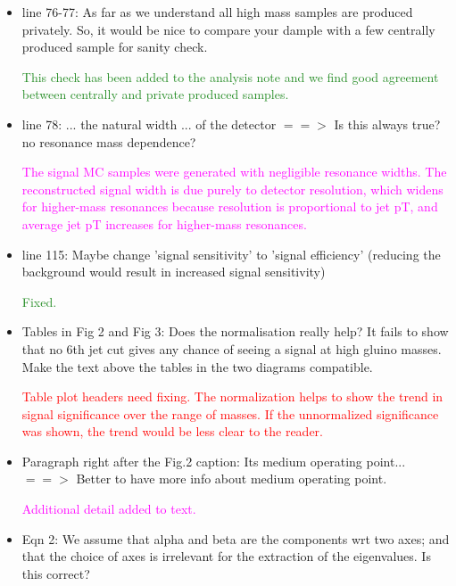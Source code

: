 \documentclass[paper=a4, fontsize=11pt]{scrartcl}
\begin{document}
\begin{itemize}
\item line 76-77: As far as we understand all high mass samples are produced privately. So, it would be nice to compare your dample with a few centrally produced sample for sanity check.

\textcolor{ForestGreen}{This check has been added to the analysis note and we find good agreement between 
centrally and private produced samples.}

\item line 78: ... the natural width ... of the detector $==>$ Is this always true? no resonance mass dependence?

\textcolor{magenta}{The signal MC samples were generated with negligible
resonance widths. The reconstructed signal width is due purely to 
detector resolution, which widens for higher-mass resonances
because resolution is proportional to jet pT, and average jet pT increases for
higher-mass resonances.}\\


\item line 115: Maybe change 'signal sensitivity' to 'signal efficiency' (reducing the background would result in increased signal sensitivity)

\textcolor{ForestGreen}{Fixed.}\\

\item Tables in Fig 2 and Fig 3: Does the normalisation really help? It fails to show that no 6th jet cut gives any chance of seeing a signal at high gluino masses. Make the text above the tables in the two diagrams compatible.

\textcolor{red}{Table plot headers need fixing. The normalization helps to
show the trend in signal significance over the range of masses. If the
unnormalized significance was shown, the trend would be less clear to the reader.}\\

\item Paragraph right after the Fig.2 caption: Its medium operating point... $==>$ Better to have more info about medium operating point.

\textcolor{magenta}{Additional detail added to text.}\\

\item Eqn 2: We assume that alpha and beta are the components wrt two axes; and that the choice of axes is irrelevant for the extraction of the eigenvalues. Is this correct?


\end{itemize}
\end{document}
